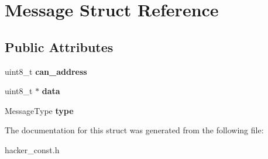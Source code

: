 \hypertarget{structMessage}{}\section{Message Struct Reference}
\label{structMessage}
\subsection*{Public Attributes}
\begin{DoxyCompactItemize}
\item 
\mbox{\label{structMessage_acc056126eaea6e24ec077efdb187c703}} 
uint8\+\_\+t {\bfseries can\+\_\+address}
\item 
\mbox{\label{structMessage_a858e7641c732b295c70e6fdb8db0fac9}} 
uint8\+\_\+t $\ast$ {\bfseries data}
\item 
\mbox{\label{structMessage_a6fc78df47d3755e088e7c658db565fc5}} 
Message\+Type {\bfseries type}
\end{DoxyCompactItemize}


The documentation for this struct was generated from the following file\+:\begin{DoxyCompactItemize}
\item 
hacker\+\_\+const.\+h\end{DoxyCompactItemize}
